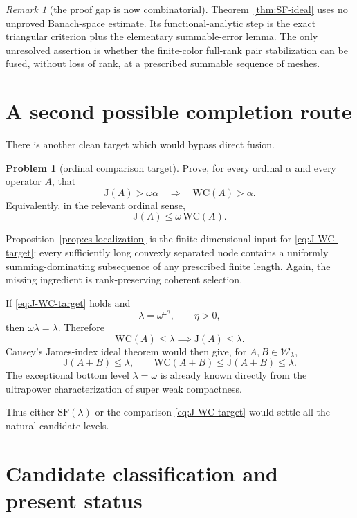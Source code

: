 \documentclass[11pt]{article}
\theoremstyle{definition}
\newtheorem{problem}[theorem]{Problem}
\theoremstyle{remark}
\newtheorem{remark}[theorem]{Remark}
\newcommand{\WC}{\mathrm{WC}}
\newcommand{\J}{\mathrm{J}}
\newcommand{\cW}{\mathcal W}
\begin{document}
\begin{remark}[the proof gap is now combinatorial]
Theorem~\ref{thm:SF-ideal} uses no unproved Banach-space estimate.  Its functional-analytic step is the exact triangular criterion plus the elementary summable-error lemma.  The only unresolved assertion is whether the finite-color full-rank pair stabilization can be fused, without loss of rank, at a prescribed summable sequence of meshes.
\end{remark}

\section{A second possible completion route}

There is another clean target which would bypass direct fusion.

\begin{problem}[ordinal comparison target]\label{prob:J-WC-comparison}
Prove, for every ordinal $\alpha$ and every operator $A$, that
\begin{equation}\label{eq:J-WC-target}
   \J(A)>\omega\alpha
   \quad\Longrightarrow\quad
   \WC(A)>\alpha.
\end{equation}
Equivalently, in the relevant ordinal sense,
\[
   \J(A)\leq\omega\,\WC(A).
\]
\end{problem}

Proposition~\ref{prop:cs-localization} is the finite-dimensional input for \eqref{eq:J-WC-target}: every sufficiently long convexly separated node contains a uniformly summing-dominating subsequence of any prescribed finite length.  Again, the missing ingredient is rank-preserving coherent selection.

If \eqref{eq:J-WC-target} holds and
\[
   \lambda=\omega^{\omega^\eta},\qquad \eta>0,
\]
then $\omega\lambda=\lambda$.  Therefore
\[
   \WC(A)\leq\lambda\implies\J(A)\leq\lambda.
\]
Causey's James-index ideal theorem would then give, for $A,B\in\cW_\lambda$,
\[
   \J(A+B)\leq\lambda,
   \qquad
   \WC(A+B)\leq\J(A+B)\leq\lambda.
\]
The exceptional bottom level $\lambda=\omega$ is already known directly from the ultrapower characterization of super weak compactness.

Thus either $\mathrm{SF}(\lambda)$ or the comparison \eqref{eq:J-WC-target} would settle all the natural candidate levels.

\section{Candidate classification and present status}
\end{document}
